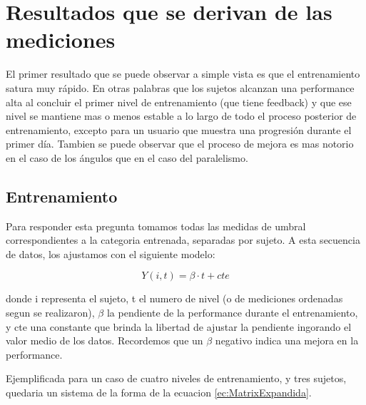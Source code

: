 \documentclass{article}
\begin{document}
\section{Resultados que se derivan de las mediciones}

El primer resultado que se puede observar a simple vista es que el entrenamiento satura muy rápido. En otras palabras que los sujetos alcanzan una performance alta al concluir el primer nivel de entrenamiento (que tiene feedback) y que ese nivel se mantiene mas o menos estable a lo largo de todo el proceso posterior de entrenamiento, excepto para un usuario que muestra una progresión durante el primer día. Tambien se puede observar que el proceso de mejora es mas notorio en el caso de los ángulos que en el caso del paralelismo. 

\subsection{Entrenamiento}

Para responder esta pregunta tomamos todas las medidas de umbral correspondientes a la categoria entrenada, separadas por sujeto. A esta secuencia de datos, los ajustamos con el siguiente modelo:


\begin{equation} \label{ec:RegresionEntrenamiento}
    Y(i,t) = \beta \cdot t + cte
\end{equation}


donde i representa el sujeto, t el numero de nivel (o de mediciones ordenadas segun se realizaron), $\beta$ la pendiente de la performance durante el entrenamiento, y cte una constante que brinda la libertad de ajustar la pendiente ingorando el valor medio de los datos. Recordemos que un $\beta$ negativo indica una mejora en la performance.

Ejemplificada para un caso de cuatro niveles de entrenamiento, y tres sujetos, quedaria un sistema de la forma de la ecuacion \ref{ec:MatrixExpandida}.
\end{document}
